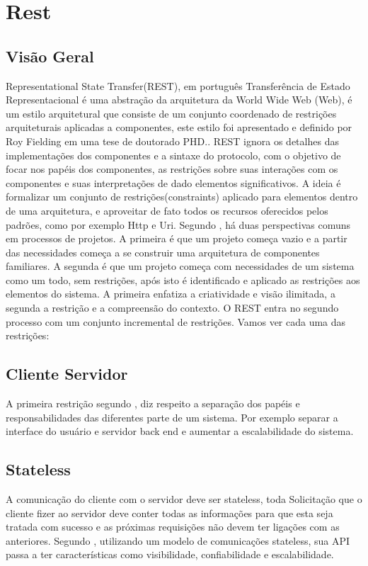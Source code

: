 \newpage
\section{Rest}

\subsection{Visão Geral}

Representational State Transfer(REST), em português Transferência de Estado Representacional é uma abstração da arquitetura da World Wide Web (Web), é um estilo arquitetural que consiste de um conjunto coordenado de restrições arquiteturais aplicadas a componentes, este estilo foi apresentado e definido por Roy Fielding em uma tese de doutorado PHD.\cite{wikipediaRest}. REST ignora os detalhes das implementações dos componentes e a sintaxe do protocolo, com o objetivo de focar nos papéis dos componentes, as restrições sobre suas interações com os componentes e suas interpretações de dado elementos significativos.  \cite{royFielding}
A ideia é formalizar um conjunto de restrições(constraints) aplicado para elementos dentro de uma arquitetura, e aproveitar de fato todos os recursos oferecidos pelos padrões, como por exemplo Http e Uri.
Segundo \cite{royFielding}, há duas perspectivas comuns em processos de projetos. A primeira é que um projeto começa vazio e a partir das necessidades começa a se construir uma arquitetura de componentes familiares. A segunda é que um projeto começa com necessidades de um sistema como um todo, sem restrições, após isto é identificado e aplicado as restrições aos elementos do sistema. A primeira enfatiza a criatividade e visão ilimitada, a segunda a restrição e a compreensão do contexto. O REST entra no segundo processo com um conjunto incremental de restrições. Vamos ver cada uma das restrições:

\subsection{Cliente Servidor}
A primeira restrição segundo \cite{royFielding}, diz respeito a separação dos papéis e responsabilidades das diferentes parte de um sistema. Por exemplo separar a interface do usuário e servidor back end e aumentar a escalabilidade do sistema.

\subsection{Stateless}
A comunicação do cliente com o servidor deve ser stateless, toda Solicitação que o cliente fizer ao servidor deve conter todas as informações para que esta seja tratada com sucesso e as próximas requisições não devem ter ligações com as anteriores. Segundo \cite{royFielding}, utilizando um modelo de comunicações stateless, sua API passa a ter características como visibilidade, confiabilidade e escalabilidade.

